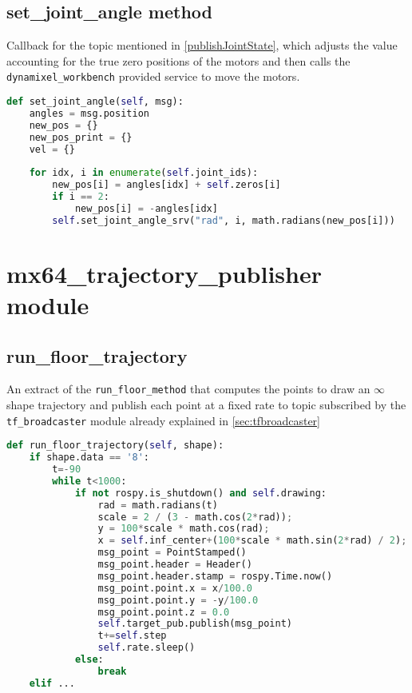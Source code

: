 \subsection*{set\_joint\_angle method}
Callback for the topic mentioned in \ref{publishJointState}, which adjusts the value accounting for the true zero positions of the motors and then calls the \texttt{dynamixel\_workbench} provided service to move the motors.
\begin{lstlisting}[caption={Set Joint Angle},label={lst:setjointangle},language=Python]
def set_joint_angle(self, msg):
    angles = msg.position
    new_pos = {}
    new_pos_print = {}
    vel = {}
    
    for idx, i in enumerate(self.joint_ids):
        new_pos[i] = angles[idx] + self.zeros[i]
        if i == 2:
            new_pos[i] = -angles[idx]
        self.set_joint_angle_srv("rad", i, math.radians(new_pos[i]))
\end{lstlisting}
\section*{mx64\_trajectory\_publisher module}
\subsection*{run\_floor\_trajectory}
An extract of the \texttt{run\_floor\_method} that computes the points to draw an $\infty$ shape trajectory and publish each point at a fixed rate to topic subscribed by the \texttt{tf\_broadcaster} module already explained in \ref{sec:tfbroadcaster}
\begin{lstlisting}[caption={Run $\infty$ Trajectory},label={lst:runfloortrajectory},language=Python]
def run_floor_trajectory(self, shape):
    if shape.data == '8':
        t=-90
        while t<1000:
            if not rospy.is_shutdown() and self.drawing:
                rad = math.radians(t)
                scale = 2 / (3 - math.cos(2*rad));
                y = 100*scale * math.cos(rad);
                x = self.inf_center+(100*scale * math.sin(2*rad) / 2);
                msg_point = PointStamped()
                msg_point.header = Header()
                msg_point.header.stamp = rospy.Time.now()
                msg_point.point.x = x/100.0
                msg_point.point.y = -y/100.0
                msg_point.point.z = 0.0
                self.target_pub.publish(msg_point)
                t+=self.step
                self.rate.sleep()
            else:
                break
    elif ...
\end{lstlisting}

